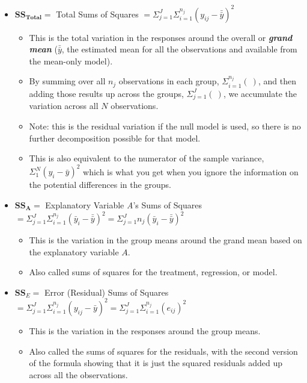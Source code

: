 \documentclass[]{book}
\theoremstyle{definition}
\theoremstyle{definition}
\theoremstyle{remark}
\begin{document}
\begin{itemize}
\item
  \(\textbf{SS}_{\textbf{Total}} =\) Total Sums of Squares
  \(= \Sigma^J_{j=1}\Sigma^{n_j}_{i=1}(y_{ij}-\bar{\bar{y}})^2\)

  \begin{itemize}
  \item
    This is the total variation in the responses around the overall or
    \textbf{\emph{grand mean}} (\(\bar{\bar{y}}\), the estimated mean
    for all the observations and available from the mean-only model).
  \item
    By summing over all \(n_j\) observations in each group,
    \(\Sigma^{n_j}_{i=1}(\ )\), and then adding those results up across
    the groups, \(\Sigma^J_{j=1}(\ )\), we accumulate the variation
    across all \(N\) observations.
  \item
    Note: this is the residual variation if the null model is used, so
    there is no further decomposition possible for that model.
  \item
    This is also equivalent to the numerator of the sample variance,
    \(\Sigma^{N}_{1}(y_{i}-\bar{y})^2\) which is what you get when you
    ignore the information on the potential differences in the groups.
  \end{itemize}
\item
  \(\textbf{SS}_{\textbf{A}} =\) Explanatory Variable \emph{A}'s Sums of
  Squares
  \(=\Sigma^J_{j=1}\Sigma^{n_j}_{i=1}(\bar{y}_{i}-\bar{\bar{y}})^2 =\Sigma^J_{j=1}n_j(\bar{y}_{i}-\bar{\bar{y}})^2\)

  \begin{itemize}
  \item
    This is the variation in the group means around the grand mean based
    on the explanatory variable \(A\).
  \item
    Also called sums of squares for the treatment, regression, or model.
  \end{itemize}
\item
  \(\textbf{SS}_E =\) Error (Residual) Sums of Squares
  \(=\Sigma^J_{j=1}\Sigma^{n_j}_{i=1}(y_{ij}-\bar{y})^2 =\Sigma^J_{j=1}\Sigma^{n_j}_{i=1}(e_{ij})^2\)

  \begin{itemize}
  \item
    This is the variation in the responses around the group means.
  \item
    Also called the sums of squares for the residuals, with the second
    version of the formula showing that it is just the squared residuals
    added up across all the observations.
  \end{itemize}
\end{itemize}
\end{document}
